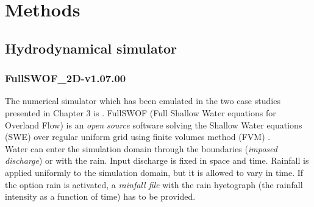 \chapter{Methods}
\label{chp:methods}


\section{Hydrodynamical simulator}

\subsection{FullSWOF\_2D-v1.07.00}

The numerical simulator which has been emulated in the two case studies presented in Chapter 3 is . FullSWOF (Full Shallow Water equations for Overland Flow) is an \emph{open source} software solving the Shallow Water equations (SWE) over regular uniform grid using finite volumes method (FVM) %
\autocite{the_fullswof_team_fullswof_2018}. \\
 
Water can enter the simulation domain through the boundaries (\emph{imposed discharge}) or with the rain.
Input discharge is fixed in space and time. Rainfall is applied uniformly to the simulation domain, but it is allowed to vary in time. If the option rain is activated, a \emph{rainfall file} with the rain hyetograph (the rainfall intensity as a function of time) has to be provided.   

